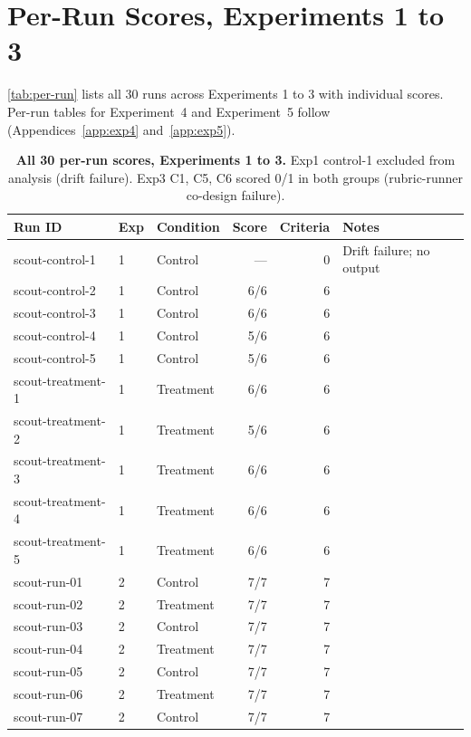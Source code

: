 \documentclass[11pt,a4paper]{article}
\begin{document}
\bigskip



\section{Per-Run Scores, Experiments 1 to 3}
\label{app:per-run}

\autoref{tab:per-run} lists all 30 runs across Experiments 1 to 3 with individual scores. Per-run tables for Experiment~4 and Experiment~5 follow (Appendices~\ref{app:exp4} and~\ref{app:exp5}).

\begin{table}[h]
\centering
\small
\caption{\small \textbf{All 30 per-run scores, Experiments 1 to 3.} Exp1 control-1 excluded from analysis (drift
failure). Exp3 C1, C5, C6 scored 0/1 in both groups (rubric-runner co-design failure).}
\label{tab:per-run}
\begin{tabular}{lllrrp{4.5cm}}
\toprule
Run ID & Exp & Condition & Score & Criteria & Notes \\
\midrule
scout-control-1   & 1 & Control   & ---  & 0 & Drift failure; no output \\
scout-control-2   & 1 & Control   & 6/6  & 6 & \\
scout-control-3   & 1 & Control   & 6/6  & 6 & \\
scout-control-4   & 1 & Control   & 5/6  & 6 & \\
scout-control-5   & 1 & Control   & 5/6  & 6 & \\
scout-treatment-1 & 1 & Treatment & 6/6  & 6 & \\
scout-treatment-2 & 1 & Treatment & 5/6  & 6 & \\
scout-treatment-3 & 1 & Treatment & 6/6  & 6 & \\
scout-treatment-4 & 1 & Treatment & 6/6  & 6 & \\
scout-treatment-5 & 1 & Treatment & 6/6  & 6 & \\
\addlinespace
scout-run-01 & 2 & Control   & 7/7 & 7 & \\
scout-run-02 & 2 & Treatment & 7/7 & 7 & \\
scout-run-03 & 2 & Control   & 7/7 & 7 & \\
scout-run-04 & 2 & Treatment & 7/7 & 7 & \\
scout-run-05 & 2 & Control   & 7/7 & 7 & \\
scout-run-06 & 2 & Treatment & 7/7 & 7 & \\
scout-run-07 & 2 & Control   & 7/7 & 7 & \\

\end{tabular}
\end{table}
\end{document}

